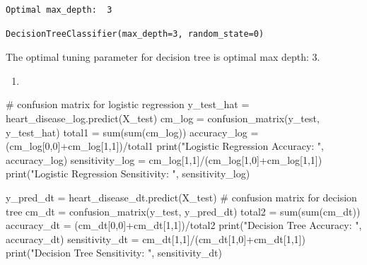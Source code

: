 \documentclass[
  11pt,
  letterpaper,
  DIV=11,
  numbers=noendperiod]{scrartcl}
\newenvironment{Shaded}{\begin{snugshade}}{\end{snugshade}}
\newcommand{\BuiltInTok}[1]{\textcolor[rgb]{0.00,0.23,0.31}{#1}}
\newcommand{\CommentTok}[1]{\textcolor[rgb]{0.37,0.37,0.37}{#1}}
\newcommand{\DecValTok}[1]{\textcolor[rgb]{0.68,0.00,0.00}{#1}}
\newcommand{\NormalTok}[1]{\textcolor[rgb]{0.00,0.23,0.31}{#1}}
\newcommand{\OperatorTok}[1]{\textcolor[rgb]{0.37,0.37,0.37}{#1}}
\newcommand{\StringTok}[1]{\textcolor[rgb]{0.13,0.47,0.30}{#1}}
\providecommand{\tightlist}{%
  \setlength{\itemsep}{0pt}\setlength{\parskip}{0pt}}\usepackage{longtable,booktabs,array}
\begin{document}
\begin{verbatim}
Optimal max_depth:  3
\end{verbatim}

\begin{verbatim}
DecisionTreeClassifier(max_depth=3, random_state=0)
\end{verbatim}

The optimal tuning parameter for decision tree is optimal max depth: 3.

\begin{enumerate}
\def\labelenumi{(\arabic{enumi})}
\setcounter{enumi}{12}
\tightlist
\item
\end{enumerate}

\begin{Shaded}
\begin{Highlighting}[]
\CommentTok{\# confusion matrix for logistic regression}
\NormalTok{y\_test\_hat }\OperatorTok{=}\NormalTok{ heart\_disease\_log.predict(X\_test)}
\NormalTok{cm\_log }\OperatorTok{=}\NormalTok{ confusion\_matrix(y\_test, y\_test\_hat)}
\NormalTok{total1 }\OperatorTok{=} \BuiltInTok{sum}\NormalTok{(}\BuiltInTok{sum}\NormalTok{(cm\_log))}
\NormalTok{accuracy\_log }\OperatorTok{=}\NormalTok{ (cm\_log[}\DecValTok{0}\NormalTok{,}\DecValTok{0}\NormalTok{]}\OperatorTok{+}\NormalTok{cm\_log[}\DecValTok{1}\NormalTok{,}\DecValTok{1}\NormalTok{])}\OperatorTok{/}\NormalTok{total1}
\BuiltInTok{print}\NormalTok{(}\StringTok{"Logistic Regression Accuracy: "}\NormalTok{, accuracy\_log)}
\NormalTok{sensitivity\_log }\OperatorTok{=}\NormalTok{ cm\_log[}\DecValTok{1}\NormalTok{,}\DecValTok{1}\NormalTok{]}\OperatorTok{/}\NormalTok{(cm\_log[}\DecValTok{1}\NormalTok{,}\DecValTok{0}\NormalTok{]}\OperatorTok{+}\NormalTok{cm\_log[}\DecValTok{1}\NormalTok{,}\DecValTok{1}\NormalTok{]) }
\BuiltInTok{print}\NormalTok{(}\StringTok{"Logistic Regression Sensitivity: "}\NormalTok{, sensitivity\_log)}

\NormalTok{y\_pred\_dt }\OperatorTok{=}\NormalTok{ heart\_disease\_dt.predict(X\_test)}
\CommentTok{\# confusion matrix for decision tree}
\NormalTok{cm\_dt }\OperatorTok{=}\NormalTok{ confusion\_matrix(y\_test, y\_pred\_dt)}
\NormalTok{total2 }\OperatorTok{=} \BuiltInTok{sum}\NormalTok{(}\BuiltInTok{sum}\NormalTok{(cm\_dt))}
\NormalTok{accuracy\_dt }\OperatorTok{=}\NormalTok{ (cm\_dt[}\DecValTok{0}\NormalTok{,}\DecValTok{0}\NormalTok{]}\OperatorTok{+}\NormalTok{cm\_dt[}\DecValTok{1}\NormalTok{,}\DecValTok{1}\NormalTok{])}\OperatorTok{/}\NormalTok{total2}
\BuiltInTok{print}\NormalTok{(}\StringTok{"Decision Tree Accuracy: "}\NormalTok{, accuracy\_dt)}
\NormalTok{sensitivity\_dt }\OperatorTok{=}\NormalTok{ cm\_dt[}\DecValTok{1}\NormalTok{,}\DecValTok{1}\NormalTok{]}\OperatorTok{/}\NormalTok{(cm\_dt[}\DecValTok{1}\NormalTok{,}\DecValTok{0}\NormalTok{]}\OperatorTok{+}\NormalTok{cm\_dt[}\DecValTok{1}\NormalTok{,}\DecValTok{1}\NormalTok{])}
\BuiltInTok{print}\NormalTok{(}\StringTok{"Decision Tree Sensitivity: "}\NormalTok{, sensitivity\_dt)}


\end{Highlighting}
\end{Shaded}
\end{document}
